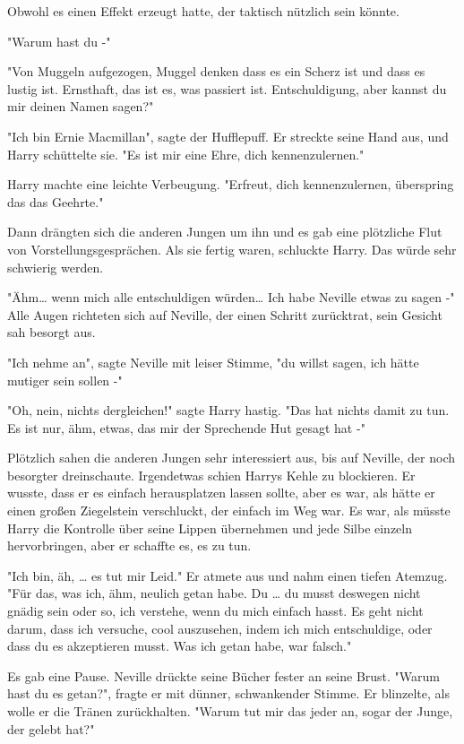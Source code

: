 {Obwohl es einen Effekt erzeugt hatte, der taktisch nützlich sein könnte.

"Warum hast du -"

"Von Muggeln aufgezogen, Muggel denken dass es ein Scherz ist und dass es lustig ist. Ernsthaft, das ist es, was passiert ist. Entschuldigung, aber kannst du mir deinen Namen sagen?"

"Ich bin Ernie Macmillan", sagte der Hufflepuff. Er streckte seine Hand aus, und Harry schüttelte sie. "Es ist mir eine Ehre, dich kennenzulernen."

Harry machte eine leichte Verbeugung. "Erfreut, dich kennenzulernen, überspring das das Geehrte."

Dann drängten sich die anderen Jungen um ihn und es gab eine plötzliche Flut von Vorstellungsgesprächen. Als sie fertig waren, schluckte Harry. Das würde sehr schwierig werden.

"Ähm… wenn mich alle entschuldigen würden… Ich habe Neville etwas zu sagen -" Alle Augen richteten sich auf Neville, der einen Schritt zurücktrat, sein Gesicht sah besorgt aus.

"Ich nehme an", sagte Neville mit leiser Stimme, "du willst sagen, ich hätte mutiger sein sollen -"

"Oh, nein, nichts dergleichen!" sagte Harry hastig. "Das hat nichts damit zu tun. Es ist nur, ähm, etwas, das mir der Sprechende Hut gesagt hat -"

Plötzlich sahen die anderen Jungen sehr interessiert aus, bis auf Neville, der noch besorgter dreinschaute. Irgendetwas schien Harrys Kehle zu blockieren. Er wusste, dass er es einfach herausplatzen lassen sollte, aber es war, als hätte er einen großen Ziegelstein verschluckt, der einfach im Weg war. Es war, als müsste Harry die Kontrolle über seine Lippen übernehmen und jede Silbe einzeln hervorbringen, aber er schaffte es, es zu tun.

"Ich bin, äh, … es tut mir Leid." Er atmete aus und nahm einen tiefen Atemzug. "Für das, was ich, ähm, neulich getan habe. Du … du musst deswegen nicht gnädig sein oder so, ich verstehe, wenn du mich einfach hasst. Es geht nicht darum, dass ich versuche, cool auszusehen, indem ich mich entschuldige, oder dass du es akzeptieren musst. Was ich getan habe, war falsch."

Es gab eine Pause. Neville drückte seine Bücher fester an seine Brust. "Warum hast du es getan?", fragte er mit dünner, schwankender Stimme. Er blinzelte, als wolle er die Tränen zurückhalten. "Warum tut mir das jeder an, sogar der Junge, der gelebt hat?"

}

